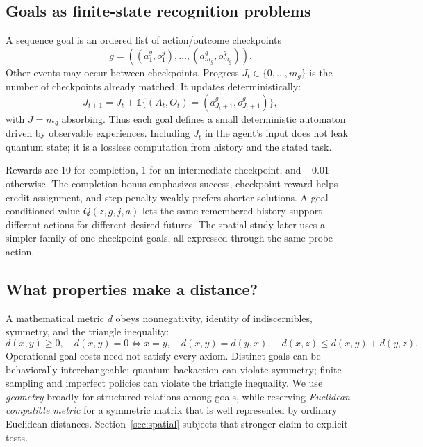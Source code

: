 \documentclass[11pt]{article}
\begin{document}
\subsection{Goals as finite-state recognition problems}

A sequence goal is an ordered list of action/outcome checkpoints
\begin{equation}
 g=((a_1^g,o_1^g),\ldots,(a_{m_g}^g,o_{m_g}^g)).
 \label{eq:sequence-goal}
\end{equation}
Other events may occur between checkpoints. Progress $J_t\in\{0,\ldots,m_g\}$
is the number of checkpoints already matched. It updates deterministically:
\begin{equation}
 J_{t+1}=J_t+\mathbb 1\{(A_t,O_t)=(a_{J_t+1}^g,o_{J_t+1}^g)\},
 \label{eq:progress-update}
\end{equation}
with $J=m_g$ absorbing. Thus each goal defines a small deterministic automaton
driven by observable experiences. Including $J_t$ in the agent's input does not
leak quantum state; it is a lossless computation from history and the stated
task.

Rewards are 10 for completion, 1 for an intermediate checkpoint, and $-0.01$
otherwise. The completion bonus emphasizes success, checkpoint reward helps
credit assignment, and step penalty weakly prefers shorter solutions. A
goal-conditioned value $Q(z,g,j,a)$ lets the same remembered history support
different actions for different desired futures. The spatial study later uses
a simpler family of one-checkpoint goals, all expressed through the same probe
action.

\subsection{What properties make a distance?}

A mathematical metric $d$ obeys nonnegativity, identity of indiscernibles,
symmetry, and the triangle inequality:
\begin{equation}
 d(x,y)\geq0,\quad d(x,y)=0\Leftrightarrow x=y,\quad
 d(x,y)=d(y,x),\quad d(x,z)\leq d(x,y)+d(y,z).
 \label{eq:metric-axioms}
\end{equation}
Operational goal costs need not satisfy every axiom. Distinct goals can be
behaviorally interchangeable; quantum backaction can violate symmetry; finite
sampling and imperfect policies can violate the triangle inequality. We use
\emph{geometry} broadly for structured relations among goals, while reserving
\emph{Euclidean-compatible metric} for a symmetric matrix that is well
represented by ordinary Euclidean distances. Section~\ref{sec:spatial}
subjects that stronger claim to explicit tests.
\end{document}
